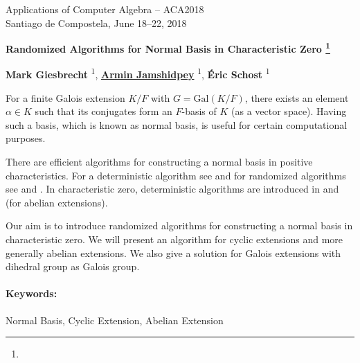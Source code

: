 \documentclass{article}
\makeatletter
\newcommand{\TITLE}[2][]{
  \begin{center} \Large \bfseries #2%
  \def\@temp{#1}\ifx\@temp\@empty\relax\else\footnote{#1}\fi\end{center}}
\newcommand{\AUTHOR}[2][]{\textbf{#2}%
  \def\@temp{#1}\ifx\@temp\@empty\relax\else\textsuperscript{#1}\fi}
\newcommand{\KEYWORDS}[1]{\paragraph{Keywords:} #1}
\newcommand{\HEADING}{
{\noindent \small Applications of Computer Algebra -- ACA2018 \\
Santiago de Compostela, June 18--22, 2018} \vspace{10pt}}
\makeatother
\begin{document}
\HEADING


\TITLE{Randomized Algorithms for Normal Basis in Characteristic Zero}




\begin{center}
 \AUTHOR[1]{Mark Giesbrecht},
 \AUTHOR[1]{\underline{Armin Jamshidpey}}, %
 \AUTHOR[1]{\'Eric Schost}
\end{center}



For a finite Galois extension $K/F$ with $G = \mathrm{Gal}(K/F)$, there exists an element $\alpha \in K$ such that
its conjugates form an $F$-basis of $K$ (as a vector space)\cite[Theorem 6.13.1]{Lang}. Having such a basis, which is known as normal basis, is useful for certain computational purposes.

There are efficient algorithms for constructing a normal basis in positive characteristics. For a deterministic algorithm see 
\cite{Augot} and for randomized algorithms see \cite{Giesbrecht} and \cite{Subquadratic}. In characteristic zero, deterministic algorithms are introduced in \cite{Girstmair} and \cite{Poli}(for abelian extensions).

Our aim is to introduce randomized algorithms for constructing a normal basis in characteristic zero. We will present an 
algorithm for cyclic extensions and more generally abelian extensions. We also give a solution for Galois extensions with
 dihedral group as Galois group.


\KEYWORDS {Normal Basis, Cyclic Extension, Abelian Extension}


\end{document}
